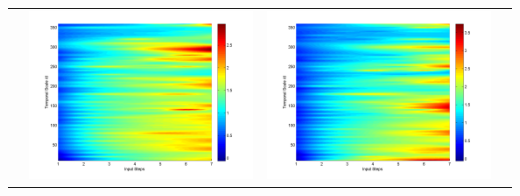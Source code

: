 \documentclass[11pt]{article}
\begin{document}
\begin{table}[H]
{\begin{tabular}{c  c   c   c  }
&\begin{minipage}{.3\textwidth}\includegraphics[width=\linewidth]{resultgraph/02375500pep.png}\end{minipage}
&\begin{minipage}{.3\textwidth}\includegraphics[width=\linewidth]{resultgraph/02375500pepq.png}\end{minipage}
\\

\end{tabular}}
\end{table}
\end{document}
